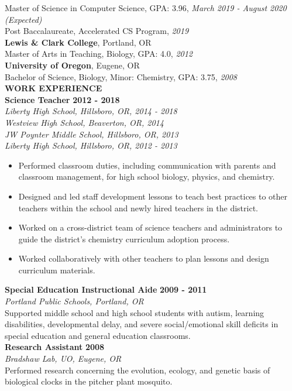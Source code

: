 \documentclass[10 pt]{article}
\begin{document}
Master of Science in Computer Science, GPA: 3.96, \textit{March 2019 - August 2020 (Expected)}\\ %
Post Baccalaureate, Accelerated CS Program, \textit{2019} \medskip \\
%
\textbf{Lewis \& Clark College}, Portland, OR\\
Master of Arts in Teaching, Biology, GPA: 4.0, \textit{2012} \medskip \\
%
\textbf{University of Oregon}, Eugene, OR\\
Bachelor of Science, Biology, Minor: Chemistry, GPA: 3.75, \textit{2008} \bigskip \\
\makebox[0pt][l]{\rule[-.2\baselineskip]{\linewidth}{.3mm}}%
\large{\textbf{WORK EXPERIENCE}}\smallskip \\
%
\textbf{Science Teacher} \hfill \textbf{2012 - 2018}\\
\textit{Liberty High School, Hillsboro, OR, 2014 - 2018}\\
\textit{Westview High School, Beaverton, OR, 2014}\\
\textit{JW Poynter Middle School, Hillsboro, OR, 2013}\\
\textit{Liberty High School, Hillsboro, OR, 2012 - 2013}
%
\begin{itemize}[leftmargin=*, itemsep=0pt, topsep=5pt]
	\item Performed classroom duties, including communication with parents and classroom management, for high school biology, physics, and chemistry.
	\item Designed and led staff development lessons to teach best practices to other teachers within the school and newly hired teachers in the district.
	\item Worked on a cross-district team of science teachers and administrators to guide the district’s chemistry curriculum adoption process.
	\item Worked collaboratively with other teachers to plan lessons and design curriculum materials.
\end{itemize}
\medbreak \noindent
%
\textbf{Special Education Instructional Aide} \hfill \textbf{2009 - 2011}\\
\textit{Portland Public Schools, Portland, OR}\\
Supported middle school and high school students with autism, learning disabilities, developmental delay, and severe social/emotional skill deficits in special education and general education classrooms.\medskip\\
%
\textbf{Research Assistant} \hfill \textbf{2008}\\
\textit{Bradshaw Lab, UO, Eugene, OR}\\
Performed research concerning the evolution, ecology, and genetic basis of biological clocks in the pitcher plant mosquito.
\end{document}
